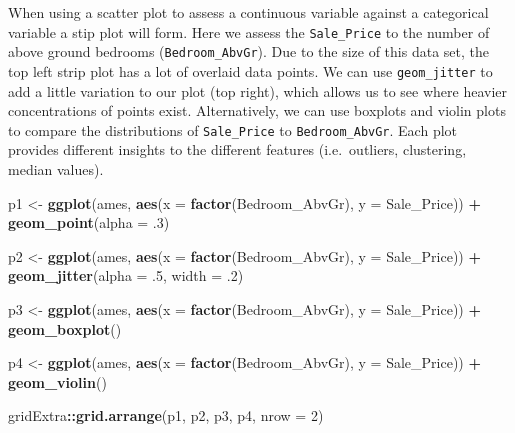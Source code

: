 \documentclass[]{article}
\newenvironment{Shaded}{\begin{snugshade}}{\end{snugshade}}
\newcommand{\KeywordTok}[1]{\textcolor[rgb]{0.13,0.29,0.53}{\textbf{#1}}}
\newcommand{\DataTypeTok}[1]{\textcolor[rgb]{0.13,0.29,0.53}{#1}}
\newcommand{\DecValTok}[1]{\textcolor[rgb]{0.00,0.00,0.81}{#1}}
\newcommand{\StringTok}[1]{\textcolor[rgb]{0.31,0.60,0.02}{#1}}
\newcommand{\OperatorTok}[1]{\textcolor[rgb]{0.81,0.36,0.00}{\textbf{#1}}}
\newcommand{\NormalTok}[1]{#1}
\begin{document}
When using a scatter plot to assess a continuous variable against a
categorical variable a stip plot will form. Here we assess the
\texttt{Sale\_Price} to the number of above ground bedrooms
(\texttt{Bedroom\_AbvGr}). Due to the size of this data set, the top
left strip plot has a lot of overlaid data points. We can use
\texttt{geom\_jitter} to add a little variation to our plot (top right),
which allows us to see where heavier concentrations of points exist.
Alternatively, we can use boxplots and violin plots to compare the
distributions of \texttt{Sale\_Price} to \texttt{Bedroom\_AbvGr}. Each
plot provides different insights to the different features
(i.e.~outliers, clustering, median values).

\begin{Shaded}
\begin{Highlighting}[]
\NormalTok{p1 <-}\StringTok{ }\KeywordTok{ggplot}\NormalTok{(ames, }\KeywordTok{aes}\NormalTok{(}\DataTypeTok{x =} \KeywordTok{factor}\NormalTok{(Bedroom_AbvGr), }\DataTypeTok{y =}\NormalTok{ Sale_Price)) }\OperatorTok{+}
\StringTok{  }\KeywordTok{geom_point}\NormalTok{(}\DataTypeTok{alpha =}\NormalTok{ .}\DecValTok{3}\NormalTok{)}

\NormalTok{p2 <-}\StringTok{ }\KeywordTok{ggplot}\NormalTok{(ames, }\KeywordTok{aes}\NormalTok{(}\DataTypeTok{x =} \KeywordTok{factor}\NormalTok{(Bedroom_AbvGr), }\DataTypeTok{y =}\NormalTok{ Sale_Price)) }\OperatorTok{+}
\StringTok{  }\KeywordTok{geom_jitter}\NormalTok{(}\DataTypeTok{alpha =}\NormalTok{ .}\DecValTok{5}\NormalTok{, }\DataTypeTok{width =}\NormalTok{ .}\DecValTok{2}\NormalTok{)}

\NormalTok{p3 <-}\StringTok{ }\KeywordTok{ggplot}\NormalTok{(ames, }\KeywordTok{aes}\NormalTok{(}\DataTypeTok{x =} \KeywordTok{factor}\NormalTok{(Bedroom_AbvGr), }\DataTypeTok{y =}\NormalTok{ Sale_Price)) }\OperatorTok{+}
\StringTok{  }\KeywordTok{geom_boxplot}\NormalTok{()}

\NormalTok{p4 <-}\StringTok{ }\KeywordTok{ggplot}\NormalTok{(ames, }\KeywordTok{aes}\NormalTok{(}\DataTypeTok{x =} \KeywordTok{factor}\NormalTok{(Bedroom_AbvGr), }\DataTypeTok{y =}\NormalTok{ Sale_Price)) }\OperatorTok{+}
\StringTok{  }\KeywordTok{geom_violin}\NormalTok{()}

\NormalTok{gridExtra}\OperatorTok{::}\KeywordTok{grid.arrange}\NormalTok{(p1, p2, p3, p4, }\DataTypeTok{nrow =} \DecValTok{2}\NormalTok{)}
\end{Highlighting}
\end{Shaded}
\end{document}
